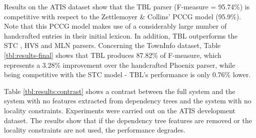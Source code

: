 \documentclass{article}
\newcommand{\efgr}[2]{
  \begin{figure}[htbp]
    \makebox[8.5cm]{\framebox[5cm]{\rule{0pt}{5cm}}}
    \caption{#2}
    \label{#1}
  \end{figure}
}
\begin{document}
Results on the ATIS dataset show that the TBL parser (F-measure = 95.74\%) is competitive with respect to the Zettlemoyer \& Collins' PCCG model \cite{zettlemoyer07} (95.9\%). Note that this PCCG model makes use of a considerably large number of handcrafted entries in their initial lexicon. In addition, TBL outperforms the STC \cite{mairesse09}, HVS \cite{he05} and MLN \cite{meza08b} parsers. Concerning the TownInfo dataset, Table \ref{tbl:results-final} shows that TBL produces 87.82\% of F-measure, which represents a 3.28\% improvement over the handcrafted Phoenix parser, while being competitive with the STC model - TBL's performance is only 0.76\% lower.




Table \ref{tbl:results:contrast} shows a contrast between the full system and the system with no features extracted from dependency trees and the system with no locality constraints. Experiments were carried out on the ATIS development dataset. The results show that if the dependency tree features are removed or the locality constraints are not used, the performance degrades.
\end{document}
